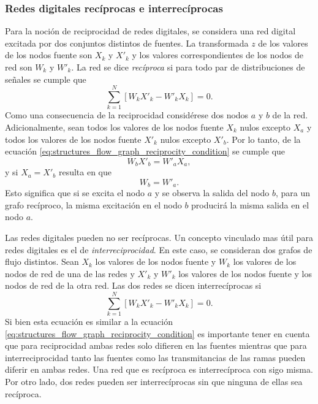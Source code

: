 \documentclass[a4paper]{report}
\begin{document}
\subsubsection{Redes digitales recíprocas e interrecíprocas}

Para la noción de reciprocidad de redes digitales, se considera una red digital excitada por dos conjuntos distintos de fuentes. La transformada \(z\) de los valores de los nodos fuente son \(X_k\) y \(X'_k\) y los valores correspondientes de los nodos de red son \(W_k\) y \(W'_k\). La red se dice \emph{recíproca} si para todo par de distribuciones de señales se cumple que 
\begin{equation}\label{eq:structures_flow_graph_reciprocity_condition}
 \sum_{k=1}^N[W_kX'_k-W'_kX_k]=0. 
\end{equation}
Como una consecuencia de la reciprocidad considérese dos nodos \(a\) y \(b\) de la red. Adicionalmente, sean todos los valores de los nodos fuente \(X_k\) nulos excepto \(X_a\) y todos los valores de los nodos fuente \(X'_k\) nulos excepto \(X'_b\). Por lo tanto, de la ecuación \ref{eq:structures_flow_graph_reciprocity_condition} se cumple que 
\[
 W_bX'_b=W'_aX_a,
\]
y si \(X_a=X'_b\) resulta en que 
\[
 W_b=W'_a.
\]
Esto significa que si se excita el nodo \(a\) y se observa la salida del nodo \(b\), para un grafo recíproco, la misma excitación en el nodo \(b\) producirá la misma salida en el nodo \(a\).

Las redes digitales pueden no ser recíprocas. Un concepto vinculado mas útil para redes digitales es el de \emph{interreciprocidad}. En este caso, se consideran dos grafos de flujo distintos. Sean \(X_k\) los valores de los nodos fuente y \(W_k\) los valores de los nodos de red de una de las redes y \(X'_k\) y \(W'_k\) los valores de los nodos fuente y los nodos de red de la otra red. Las dos redes se dicen interrecíprocas si 
\begin{equation}\label{eq:structures_flow_graph_interreciprocity_condition}
 \sum_{k=1}^N[W_kX'_k-W'_kX_k]=0. 
\end{equation}
Si bien esta ecuación es similar a la ecuación \ref{eq:structures_flow_graph_reciprocity_condition} es importante tener en cuenta que para reciprocidad ambas redes solo difieren en las fuentes mientras que para interreciprocidad tanto las fuentes como las transmitancias de las ramas pueden diferir en ambas redes. Una red que es recíproca es interrecíproca con sigo misma. Por otro lado, dos redes pueden ser interrecíprocas sin que ninguna de ellas sea recíproca.
\end{document}
